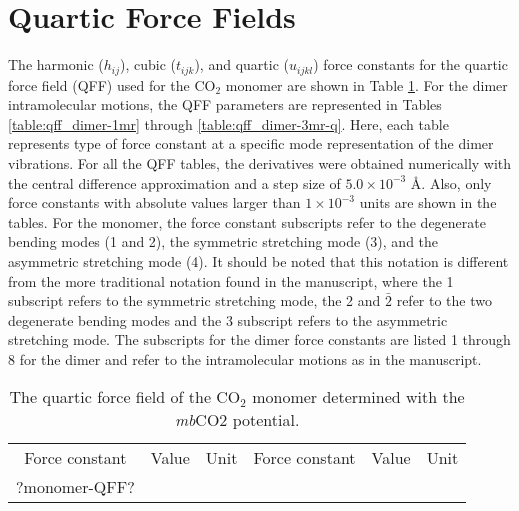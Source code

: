 \documentclass[aip,jcp,showpacs,superscriptaddress,groupedaddress]{revtex4-1}  %
\begin{document}
\section[S1]{Quartic Force Fields}
The harmonic ($h_{ij}$), cubic ($t_{ijk}$), and quartic ($u_{ijkl}$) force constants for the quartic force field (QFF) used for the CO$_2$ monomer are shown in Table \ref{table:qff_monomer}. For the dimer intramolecular motions, the QFF parameters are represented in Tables \ref{table:qff_dimer-1mr} through \ref{table:qff_dimer-3mr-q}. Here, each table represents type of force constant at a specific mode representation of the dimer vibrations. For all the QFF tables, the derivatives were obtained numerically with the central difference approximation and a step size of $5.0 \times10^{-3}$ \AA.  Also, only force constants with absolute values larger than $1\times10^{-3}$ units are shown in the tables. %
For the monomer, the force constant subscripts refer to the degenerate bending modes (1 and 2), the symmetric stretching mode (3), and the asymmetric stretching mode (4). It should be noted that this notation is different from the more traditional notation found in the manuscript, where the 1 subscript refers to the symmetric stretching mode, the 2 and $\bar{2}$ refer to the two degenerate bending modes and the 3 subscript refers to the asymmetric stretching mode. The subscripts for the dimer force constants are listed 1 through 8 for the dimer and refer to the intramolecular motions as in the manuscript. 

\begin{table}[]
\centering
\caption{The quartic force field of the CO$_2$ monomer determined with the \emph{mb}CO2 potential.}
\label{table:qff_monomer}
\begin{ruledtabular}
\begin{tabular}{cccccc}
Force constant & Value        & Unit  & Force constant & Value        & Unit     \\
 ?monomer-QFF?
\end{tabular}
\end{ruledtabular}
\end{table}
\end{document}
